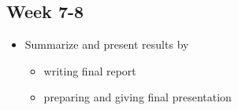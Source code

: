 \documentclass{article}
\numberwithin{equation}{section}
\theoremstyle{definition}
\begin{document}


\subsection*{Week 7-8}
\begin{itemize}[noitemsep]
    \item Summarize and present results by
    \begin{itemize}
        \item writing final report
        \item preparing and giving final presentation
    \end{itemize}
\end{itemize}

\end{document}
